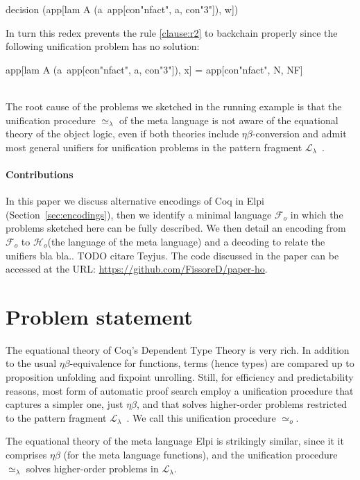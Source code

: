 \documentclass[sigconf,natbib=false,review]{acmart}
\newcommand{\UnifRel}{\ensuremath{\simeq}}
\newcommand{\Uo}{\ensuremath{\UnifRel_o}\xspace}
\newcommand{\Ue}{\ensuremath{\UnifRel_\lambda}\xspace}
\newcommand{\llambda}{\ensuremath{\mathcal{L}_\lambda}\xspace}
\newcommand{\Fo}{\ensuremath{\mathcal{F}_{\!o}\xspace}} %
\newcommand{\Ho}{\ensuremath{\mathcal{H}_o}\xspace}
\begin{document}
\begin{elpicode}
decision (app[lam A (a\ app[con"nfact", a, con"3"]), w])
\end{elpicode}

\noindent
In turn this redex prevents the rule \ref{clause:r2} to backchain properly since
the following unification problem has no solution:

\begin{elpicode}
app[lam A (a\ app[con"nfact", a, con"3"]), x] =
app[con"nfact", N, NF]
\end{elpicode}
\noindent
~\\
The root cause of the problems we sketched in the running example
is that the unification procedure \Ue of the meta language is not aware
of the equational theory of the object logic, even if both theories
include $\eta\beta$-conversion and admit most general
unifiers for unification problems in the pattern fragment \llambda~\cite{miller92jsc}.

\paragraph{Contributions}
In this paper we discuss alternative encodings of Coq in
Elpi (Section~\ref{sec:encodings}), then we identify a minimal language \Fo{}
in which the problems sketched here can be fully described.
We then detail an encoding  from \Fo{} to \Ho (the language of
the meta language) and a decoding  to relate the unifiers
bla bla.. TODO citare Teyjus.
The code discussed in the paper can be accessed at the URL:
\url{https://github.com/FissoreD/paper-ho}.

\section{Problem statement} %
\label{sec:problem-statement}

The equational theory of Coq's Dependent Type Theory is very rich. In
addition to the usual $\eta\beta$-equivalence for functions, terms (hence types)
are compared up to proposition unfolding and fixpoint unrolling. Still,
for efficiency and predictability reasons, most form of automatic proof search
employ a unification procedure that captures a simpler one,
just $\eta\beta$, and that solves higher-order problems
restricted to the pattern fragment $\llambda$~\cite{miller92jsc}.
We call this unification procedure \Uo{}.

The equational theory of the meta language Elpi is strikingly similar,
since it it comprises $\eta\beta$ (for the meta language functions), and the
unification procedure \Ue{} solves higher-order problems in
$\llambda$.
\end{document}
